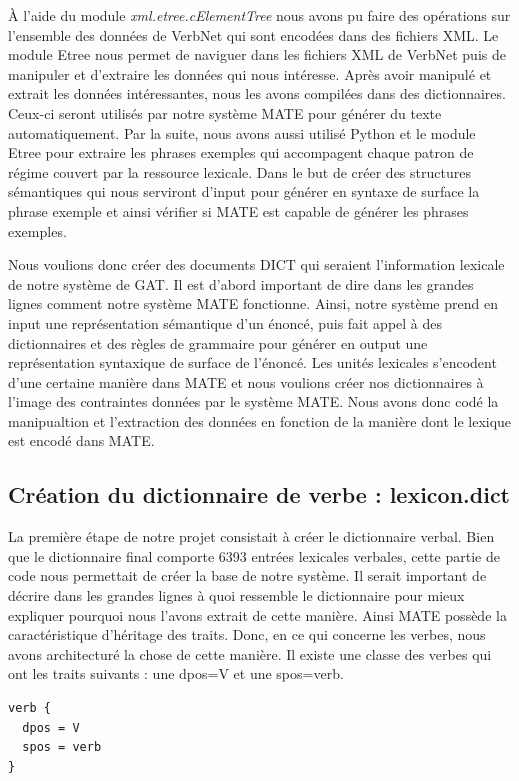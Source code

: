 À l'aide du module \emph{xml.etree.cElementTree} nous avons pu faire des opérations sur l'ensemble des données de VerbNet qui sont encodées dans des fichiers XML. Le module Etree nous permet de naviguer dans les fichiers XML de VerbNet puis de manipuler et d'extraire les données qui nous intéresse. Après avoir manipulé et extrait les données intéressantes, nous les avons compilées dans des dictionnaires. Ceux-ci seront utilisés par notre système MATE pour générer du texte automatiquement. Par la suite, nous avons aussi utilisé Python et le module Etree pour extraire les phrases exemples qui accompagent chaque patron de régime couvert par la ressource lexicale. Dans le but de créer des structures sémantiques qui nous serviront d'input pour générer en syntaxe de surface la phrase exemple et ainsi vérifier si MATE est capable de générer les phrases exemples.

Nous voulions donc créer des documents DICT qui seraient l'information lexicale de notre système de GAT. Il est d'abord important de dire dans les grandes lignes comment notre système MATE fonctionne. Ainsi, notre système prend en input une représentation sémantique d'un énoncé, puis fait appel à des dictionnaires et des règles de grammaire pour générer en output une représentation syntaxique de surface de l'énoncé. Les unités lexicales s'encodent d'une certaine manière dans MATE et nous voulions créer nos dictionnaires à l'image des contraintes données par le système MATE. Nous avons donc codé la manipualtion et l'extraction des données en fonction de la manière dont le lexique est encodé dans MATE.

\subsection{Création du dictionnaire de verbe : lexicon.dict}

La première étape de notre projet consistait à créer le dictionnaire verbal. Bien que le dictionnaire final comporte 6393 entrées lexicales verbales, cette partie de code nous permettait de créer la base de notre système. Il serait important de décrire dans les grandes lignes à quoi ressemble le dictionnaire pour mieux expliquer pourquoi nous l'avons extrait de cette manière. Ainsi MATE possède la caractéristique d'héritage des traits. Donc, en ce qui concerne les verbes, nous avons architecturé la chose de cette manière. Il existe une classe des verbes qui ont les traits suivants : une dpos=V et une spos=verb.

\begin{lstlisting}[language=XML]
verb {
  dpos = V
  spos = verb
}
\end{lstlisting}


